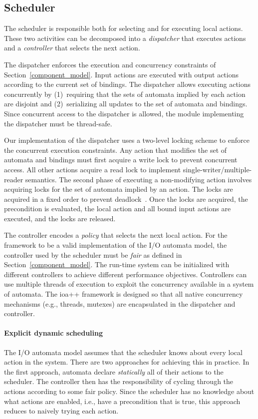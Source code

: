 \subsection{Scheduler\label{scheduling}}

The scheduler is responsible both for selecting and for executing local actions.
These two activities can be decomposed into a \emph{dispatcher} that executes actions and a \emph{controller} that selects the next action.

The dispatcher enforces the execution and concurrency constraints of Section~\ref{component_model}.
Input actions are executed with output actions according to the current set of bindings.
The dispatcher allows executing actions concurrently by (1)~requiring that the sets of automata implied by each action are disjoint and (2)~serializing all updates to the set of automata and bindings.
Since concurrent access to the dispatcher is allowed, the module implementing the dispatcher must be thread-safe.

Our implementation of the dispatcher uses a two-level locking scheme to enforce the concurrent execution constraints.
Any action that modifies the set of automata and bindings must first acquire a write lock to prevent concurrent access.
All other actions acquire a read lock to implement single-writer/multiple-reader semantics.
The second phase of executing a non-modifying action involves acquiring locks for the set of automata implied by an action.
The locks are acquired in a fixed order to prevent deadlock~\cite{havender1968avoiding}.
Once the locks are acquired, the precondition is evaluated, the local action and all bound input actions are executed, and the locks are released.

The controller encodes a \emph{policy} that selects the next local action.
For the framework to be a valid implementation of the I/O automata model, the controller used by the scheduler must be \emph{fair} as defined in Section~\ref{component_model}.
The run-time system can be initialized with different controllers to achieve different performance objectives.
Controllers can use multiple threads of execution to exploit the concurrency available in a system of automata.
The ioa++ framework is designed so that all native concurrency mechanisms (e.g., threads, mutexes) are encapsulated in the dispatcher and controller.

\paragraph*{Explicit dynamic scheduling}
The I/O automata model assumes that the scheduler knows about every local action in the system.
There are two approaches for achieving this in practice.
In the first approach, automata declare \emph{statically} all of their actions to the scheduler.
The controller then has the responsibility of cycling through the actions according to some fair policy.
Since the scheduler has no knowledge about what actions are enabled, i.e., have a precondition that is true, this approach reduces to naively trying each action.

